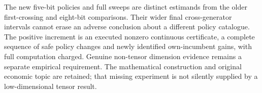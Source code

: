 The new five-bit policies and full sweeps are distinct estimands from the older first-crossing and eight-bit comparisons. Their wider final cross-generator intervals cannot erase an adverse conclusion about a different policy catalogue. The positive increment is an executed nonzero continuous certificate, a complete sequence of safe policy changes and newly identified own-incumbent gains, with full computation charged. Genuine non-tensor dimension evidence remains a separate empirical requirement. The mathematical construction and original economic topic are retained; that missing experiment is not silently supplied by a low-dimensional tensor result.

